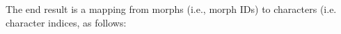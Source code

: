 The end result 
is a mapping from morphs (i.e., morph IDs) to characters (i.e. character indices, as follows:
